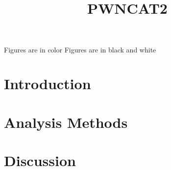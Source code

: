 \documentclass[12pt,preprint]{aastex}
\begin{document}
\title{PWNCAT2}


\ifcolorfigure
  Figures are in color
\else
  Figures are in black and white
\fi





\begin{abstract}
  
\end{abstract}

\section{Introduction}



\section{Analysis Methods}


\section{Discussion}







\end{document}
